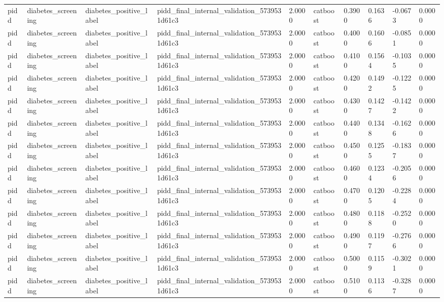 \begin{tabular}{llllllllll}
pidd & diabetes\_screening & diabetes\_positive\_label & pidd\_final\_internal\_validation\_5739531d61c3 & 2.0000 & catboost & 0.3900 & 0.1636 & -0.0673 & 0.0000 \\
pidd & diabetes\_screening & diabetes\_positive\_label & pidd\_final\_internal\_validation\_5739531d61c3 & 2.0000 & catboost & 0.4000 & 0.1606 & -0.0851 & 0.0000 \\
pidd & diabetes\_screening & diabetes\_positive\_label & pidd\_final\_internal\_validation\_5739531d61c3 & 2.0000 & catboost & 0.4100 & 0.1564 & -0.1035 & 0.0000 \\
pidd & diabetes\_screening & diabetes\_positive\_label & pidd\_final\_internal\_validation\_5739531d61c3 & 2.0000 & catboost & 0.4200 & 0.1492 & -0.1225 & 0.0000 \\
pidd & diabetes\_screening & diabetes\_positive\_label & pidd\_final\_internal\_validation\_5739531d61c3 & 2.0000 & catboost & 0.4300 & 0.1427 & -0.1422 & 0.0000 \\
pidd & diabetes\_screening & diabetes\_positive\_label & pidd\_final\_internal\_validation\_5739531d61c3 & 2.0000 & catboost & 0.4400 & 0.1348 & -0.1626 & 0.0000 \\
pidd & diabetes\_screening & diabetes\_positive\_label & pidd\_final\_internal\_validation\_5739531d61c3 & 2.0000 & catboost & 0.4500 & 0.1255 & -0.1837 & 0.0000 \\
pidd & diabetes\_screening & diabetes\_positive\_label & pidd\_final\_internal\_validation\_5739531d61c3 & 2.0000 & catboost & 0.4600 & 0.1234 & -0.2056 & 0.0000 \\
pidd & diabetes\_screening & diabetes\_positive\_label & pidd\_final\_internal\_validation\_5739531d61c3 & 2.0000 & catboost & 0.4700 & 0.1205 & -0.2284 & 0.0000 \\
pidd & diabetes\_screening & diabetes\_positive\_label & pidd\_final\_internal\_validation\_5739531d61c3 & 2.0000 & catboost & 0.4800 & 0.1188 & -0.2520 & 0.0000 \\
pidd & diabetes\_screening & diabetes\_positive\_label & pidd\_final\_internal\_validation\_5739531d61c3 & 2.0000 & catboost & 0.4900 & 0.1197 & -0.2766 & 0.0000 \\
pidd & diabetes\_screening & diabetes\_positive\_label & pidd\_final\_internal\_validation\_5739531d61c3 & 2.0000 & catboost & 0.5000 & 0.1159 & -0.3021 & 0.0000 \\
pidd & diabetes\_screening & diabetes\_positive\_label & pidd\_final\_internal\_validation\_5739531d61c3 & 2.0000 & catboost & 0.5100 & 0.1136 & -0.3287 & 0.0000 \\

\end{tabular}
